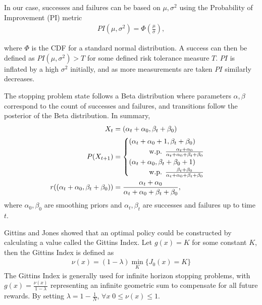 In our case, successes and failures can be based on $\mu, \sigma^2$ using the Probability of Improvement (PI) metric
\begin{align}
  PI(\mu, \sigma^2) = \Phi(\frac{\mu}{\sigma}),
\end{align}

where $\Phi$ is the CDF for a standard normal distribution. A success can then be defined as $PI(\mu, \sigma^2) > T$ for some defined risk tolerance measure $T$. $PI$ is inflated by a high $\sigma^2$ initially, and as more measurements are taken $PI$ similarly decreases. 

The stopping problem state follows a Beta distribution where parameters $\alpha,\beta$ correspond to the count of successes and failures, and transitions follow the posterior of the Beta distribution. In summary,
\begin{align}
\begin{split}
  X_t &= (\alpha_t + \alpha_0, \beta_t + \beta_0) \\
  P(X_{t+1}) &=
  \begin{cases}
      (\alpha_t + \alpha_0 + 1, \beta_t + \beta_0)
      \\ \hspace*{1cm}\text{w.p. } \frac{\alpha_t + \alpha_0}{\alpha_t + \alpha_0 + \beta_t + \beta_0}\\
      (\alpha_t + \alpha_0, \beta_t + \beta_0 + 1)
      \\ \hspace*{1cm}\text{w.p. } \frac{\beta_t + \beta_0}{\alpha_t + \alpha_0 + \beta_t + \beta_0}
  \end{cases}\\
  r((\alpha_t + \alpha_0, \beta_t + \beta_0)) &= \frac{\alpha_t + \alpha_0}{\alpha_t + \alpha_0 + \beta_t + \beta_0},\\
\end{split}
\end{align}
where $\alpha_0,\beta_0$ are smoothing priors and $\alpha_t,\beta_t$ are successes and failures up to time $t$.

Gittins and Jones showed that an optimal policy could be constructed by calculating a value called the Gittins Index. Let $g(x) = K$ for some constant $K$, then the Gittins Index is defined as
\begin{align}
  \nu(x) = (1-\lambda)\min_{K} \{J_0(x) = K\}
\end{align}
The Gittins Index is generally used for infinite horizon stopping problems, with $g(x)=\frac{\nu(x)}{1-\lambda}$ representing an infinite geometric sum to compensate for all future rewards. By setting $\lambda=1-\frac{1}{N}$, $\forall x \; 0 \leq \nu(x) \leq 1$.

